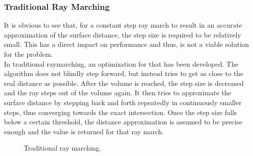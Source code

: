\pagebreak
\subsubsection{Traditional Ray Marching}
It is obvious to see that, for a constant step ray march to result in an accurate approximation of the surface distance, the step size is required to be relatively small.
This has a direct impact on performance and thus, is not a viable solution for the problem.
\\
In traditional \gls{raymarching}, an optimization for that has been developed. The algorithm does not blindly step forward, but instead tries to get as close to the real distance as possible.
After the volume is reached, the step size is decreased and the ray steps out of the volume again. It then tries to approximate the surface distance by stepping back and forth repeatedly in continuously smaller steps, thus converging towards the exact intersection.
Once the step size falls below a certain threshold, the distance approximation is assumed to be precise enough and the value is returned for that ray march.

\begin{figure}[H]
    \centering
    \caption{Traditional ray marching.}
\end{figure}

